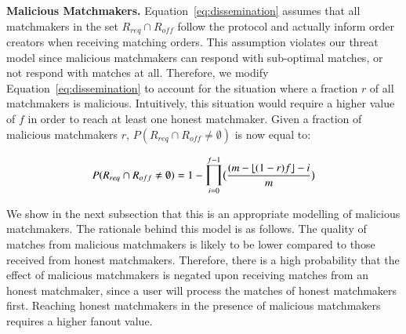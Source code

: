 \textbf{Malicious Matchmakers.}
Equation~\ref{eq:dissemination} assumes that all matchmakers in the set $ R_{req} \cap R_{off} $ follow the protocol and actually inform order creators when receiving matching orders.
This assumption violates our threat model since malicious matchmakers can respond with sub-optimal matches, or not respond with matches at all.
Therefore, we modify Equation~\ref{eq:dissemination} to account for the situation where a fraction $ r $ of all matchmakers is malicious.
Intuitively, this situation would require a higher value of $ f $ in order to reach at least one honest matchmaker.
Given a fraction of malicious matchmakers $ r $, $ P(R_{req} \cap R_{off} \neq \emptyset) $ is now equal to:

\begin{equation}
P(R_{req} \cap R_{off} \neq \emptyset) = 1 - \mathlarger{\prod}_{i=0}^{f-1} \big(\frac{(m - \left \lfloor{(1-r)f}\right \rfloor - i}{m}\big)
\label{eq:malicious_dissemination}
\end{equation}

We show in the next subsection that this is an appropriate modelling of malicious matchmakers.
The rationale behind this model is as follows.
The quality of matches from malicious matchmakers is likely to be lower compared to those received from honest matchmakers.
Therefore, there is a high probability that the effect of malicious matchmakers is negated upon receiving matches from an honest matchmaker, since a user will process the matches of honest matchmakers first.
Reaching honest matchmakers in the presence of malicious matchmakers requires a higher fanout value.

